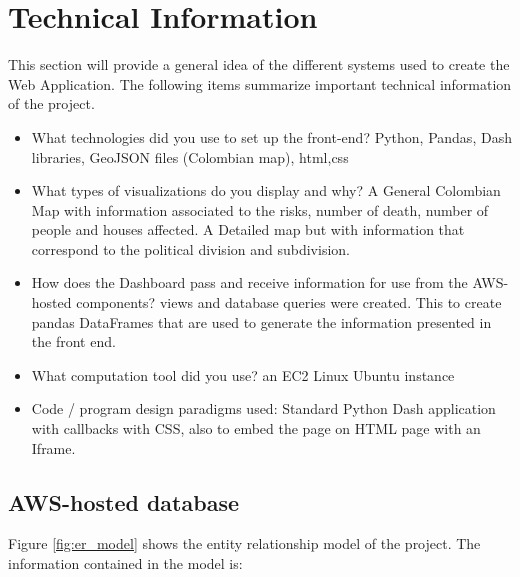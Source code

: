 \section{Technical Information}
\label{sec:Tech}



This section will provide a general idea of the different systems used to create the Web Application. The following items summarize important technical information of the project.

\begin{itemize}

\item What technologies did you use to set up the front-end? Python, Pandas, Dash libraries, GeoJSON files (Colombian map), html,css
\item What types of visualizations do you display and why?
A General Colombian Map with information associated to the risks, number of death,  number of people and houses affected. A Detailed map but with information that correspond to the political division and subdivision.
\item How does the Dashboard pass and receive information for use from the AWS-hosted
components? views and database queries were created. This to create pandas DataFrames that are used to generate the information presented in the front end.

\item What computation tool did you use? an EC2 Linux Ubuntu instance
\item Code / program design paradigms used: Standard Python Dash application with callbacks  with CSS, also to embed the  page on HTML page with an Iframe.


\end{itemize}




\subsection{AWS-hosted database}

Figure \ref{fig:er_model} shows the entity relationship model of the project. The information contained in the model is:

